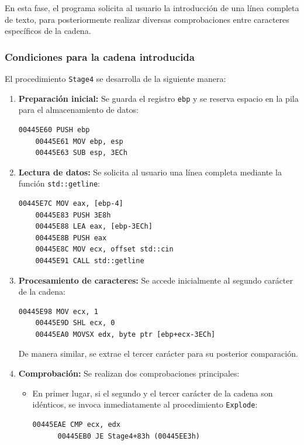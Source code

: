 \documentclass[11pt,a4paper]{article}
\begin{document}
\noindent En esta fase, el programa solicita al usuario la introducción de una línea completa de texto, para posteriormente realizar diversas comprobaciones entre caracteres específicos de la cadena.\vspace{2ex}

\subsubsection{Condiciones para la cadena introducida}
\noindent El procedimiento \texttt{Stage4} se desarrolla de la siguiente manera:
\begin{enumerate}
  \item \textbf{Preparación inicial:} Se guarda el registro \texttt{ebp} y se reserva espacio en la pila para el almacenamiento de datos:\vspace{1ex}
  \begin{lstlisting}[style=assemblyStyle]
    00445E60 PUSH ebp
    00445E61 MOV ebp, esp
    00445E63 SUB esp, 3ECh
  \end{lstlisting}
  \vspace{1ex}

  \item \textbf{Lectura de datos:} Se solicita al usuario una línea completa mediante la función \texttt{std::getline}: \vspace{1ex}
  \begin{lstlisting}[style=assemblyStyle]
    00445E7C MOV eax, [ebp-4]
    00445E83 PUSH 3E8h
    00445E88 LEA eax, [ebp-3ECh]
    00445E8B PUSH eax
    00445E8C MOV ecx, offset std::cin
    00445E91 CALL std::getline
  \end{lstlisting}
  \vspace{3ex}

  \item \textbf{Procesamiento de caracteres:} Se accede inicialmente al segundo carácter de la cadena: \vspace{1ex}
  \begin{lstlisting}[style=assemblyStyle]
    00445E98 MOV ecx, 1
    00445E9D SHL ecx, 0
    00445EA0 MOVSX edx, byte ptr [ebp+ecx-3ECh]
  \end{lstlisting}
  \vspace{1ex}
  De manera similar, se extrae el tercer carácter para su posterior comparación. \vspace{1ex}

  \item \textbf{Comprobación:} Se realizan dos comprobaciones principales:
  \begin{itemize}
    \item En primer lugar, si el segundo y el tercer carácter de la cadena son idénticos, se invoca inmediatamente al procedimiento \texttt{Explode}: \vspace{1ex}
    \begin{lstlisting}[style=assemblyStyle]
      00445EAE CMP ecx, edx
      00445EB0 JE Stage4+83h (00445EE3h)
    \end{lstlisting}
    \vspace{1ex}


\end{itemize}
\end{enumerate}
\end{document}
